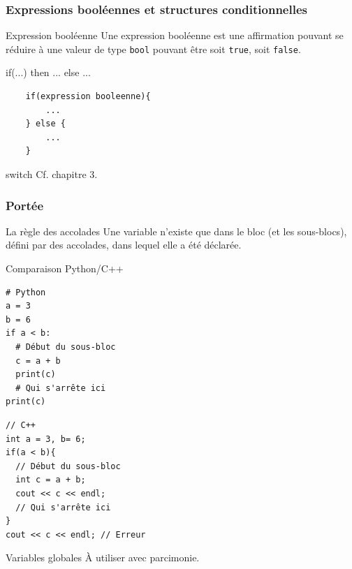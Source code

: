 \begin{frame}[fragile]
	\frametitle{Expressions booléennes et structures conditionnelles}

    \begin{block}{Expression booléenne}
    Une expression booléenne est une affirmation pouvant se réduire à une valeur de type \texttt{bool} pouvant être soit \texttt{true}, soit \texttt{false}.
    \end{block}
    
    \begin{exampleblock}{if(...) then ... else ...}
    \begin{verbatim}
    if(expression booleenne){
    	...
    } else {
    	...
    }
    \end{verbatim}
    \end{exampleblock}
    
    \begin{exampleblock}{switch}
    Cf. chapitre 3.
    \end{exampleblock}
\end{frame}

\begin{frame}[fragile=singleslide]
	\frametitle{Portée}
    \begin{block}{La règle des accolades}
    Une variable n'existe que dans le bloc (et les sous-blocs), défini par des accolades, dans lequel elle a été déclarée.
    \end{block}
    
    \begin{exampleblock}{Comparaison Python/C++}
    \vspace{-0.5em}
    \begin{minipage}{0.48\textwidth}
    \begin{verbatim}
# Python
a = 3
b = 6
if a < b:
  # Début du sous-bloc
  c = a + b
  print(c)
  # Qui s'arrête ici
print(c)
    \end{verbatim}
    \end{minipage}
    \begin{minipage}{0.48\textwidth}
    \begin{verbatim}
// C++
int a = 3, b= 6;
if(a < b){
  // Début du sous-bloc
  int c = a + b;
  cout << c << endl;
  // Qui s'arrête ici
}
cout << c << endl; // Erreur
    \end{verbatim}
    \end{minipage}
    \vspace{-0.5em}
    \end{exampleblock}
    
    \begin{alertblock}{Variables globales}
    À utiliser avec parcimonie.
    \end{alertblock}
\end{frame}

